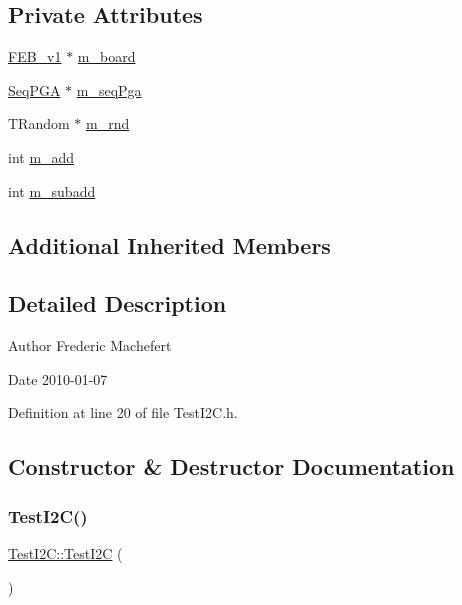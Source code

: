\subsection*{Private Attributes}
\begin{DoxyCompactItemize}
\item 
\hyperlink{classFEB__v1}{F\+E\+B\+\_\+v1} $\ast$ \hyperlink{classTestI2C_adc621a1ca623e2f58a06b65c76722a91}{m\+\_\+board}
\item 
\hyperlink{classSeqPGA}{Seq\+P\+GA} $\ast$ \hyperlink{classTestI2C_a0dde635489298c8d914de5f925de0b62}{m\+\_\+seq\+Pga}
\item 
T\+Random $\ast$ \hyperlink{classTestI2C_a081620c62b9da7d6bdf335a3dd992e65}{m\+\_\+rnd}
\item 
int \hyperlink{classTestI2C_a3dbd7e079a36aa6f476f0e3c0a9bf844}{m\+\_\+add}
\item 
int \hyperlink{classTestI2C_aad3dc346b1a081e514e1d9681f89738f}{m\+\_\+subadd}
\end{DoxyCompactItemize}
\subsection*{Additional Inherited Members}


\subsection{Detailed Description}
\begin{DoxyAuthor}{Author}
Frederic Machefert 
\end{DoxyAuthor}
\begin{DoxyDate}{Date}
2010-\/01-\/07 
\end{DoxyDate}


Definition at line 20 of file Test\+I2\+C.\+h.



\subsection{Constructor \& Destructor Documentation}
\mbox{\label{classTestI2C_a0fd4ba8d4696e9dd699b365ce91115e7}} 
\subsubsection{\texorpdfstring{Test\+I2\+C()}{TestI2C()}}
{\footnotesize\ttfamily \hyperlink{classTestI2C_1_1TestI2C}{Test\+I2\+C\+::\+Test\+I2C} (\begin{DoxyParamCaption}{ }\end{DoxyParamCaption})}



